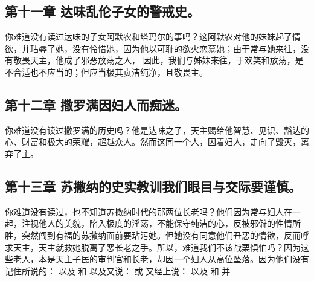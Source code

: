 
\subsection{第十一章 达味乱伦子女的警戒史。}

你难道没有读过达味的子女阿默农和塔玛尔的事吗？这阿默农对他的妹妹起了情欲，并玷辱了她，没有怜惜她，因为他以可耻的欲火恋慕她；由于常与她来往，没有敬畏天主，他成了邪恶放荡之人，  因此，我们与姊妹来往，于欢笑和放荡，是不合适也不应当的；但应当极其贞洁纯净，且敬畏主。\par


\subsection{第十二章 撒罗满因妇人而痴迷。}

你难道没有读过撒罗满的历史吗？他是达味之子，天主赐给他智慧、见识、豁达的心、财富和极大的荣耀，超越众人。然而这同一个人，因着妇人，走向了毁灭，离弃了主。\par


\subsection{第十三章 苏撒纳的史实教训我们眼目与交际要谨慎。}

你难道没有读过，也不知道苏撒纳时代的那两位长老吗？他们因为常与妇人在一起，注视他人的美貌，陷入极度的淫荡，不能保守纯洁的心，反被邪僻的性情所胜，突然闯到有福的苏撒纳面前要玷污她。但她没有同意他们丑恶的情欲，反而呼求天主，天主就救她脱离了恶长老之手。所以，难道我们不该战栗惧怕吗？因为这些老人，本是天主子民的审判官和长老，却因一个妇人从高位坠落。因为他们没有记住所说的： 以及  和  以及又说：  或  又经上说：  以及  和  并 \par

